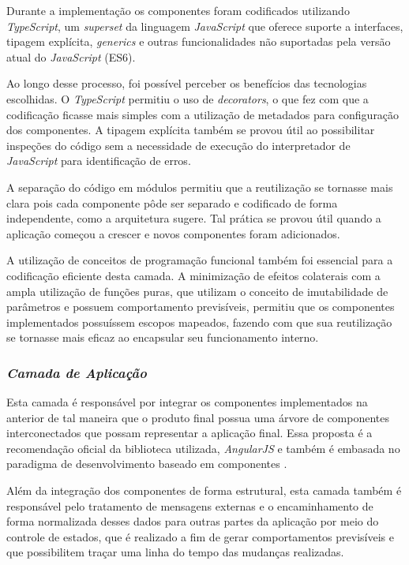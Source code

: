 Durante a implementação os componentes foram codificados utilizando \textit{TypeScript}, um \textit{superset} da linguagem \textit{JavaScript} que oferece suporte a interfaces, tipagem explícita, \textit{generics} e outras funcionalidades não suportadas pela versão atual do \textit{JavaScript} (ES6).

Ao longo desse processo, foi possível perceber os benefícios das tecnologias escolhidas. O \textit{TypeScript} permitiu o uso de \textit{decorators}, o que fez com que a codificação ficasse mais simples com a utilização de metadados para configuração dos componentes. A tipagem explícita também se provou útil ao possibilitar inspeções do código sem a necessidade de execução do interpretador de \textit{JavaScript} para identificação de erros. 

A separação do código em módulos permitiu que a reutilização se tornasse mais clara pois cada componente pôde ser separado e codificado de forma independente, como a arquitetura sugere. Tal prática se provou útil quando a aplicação começou a crescer e novos componentes foram adicionados.

A utilização de conceitos de programação funcional também foi essencial para a codificação eficiente desta camada. A minimização de efeitos colaterais com a ampla utilização de funções puras, que utilizam o conceito de imutabilidade de parâmetros e possuem comportamento previsíveis, permitiu que os componentes implementados possuíssem escopos mapeados, fazendo com que sua reutilização se tornasse mais eficaz ao encapsular seu funcionamento interno.

\subsubsection{{\it Camada de Aplicação}}

Esta camada é responsável por integrar os componentes implementados na anterior de tal maneira que o produto final possua uma árvore de componentes interconectados que possam representar a aplicação final. Essa proposta é a recomendação oficial da biblioteca utilizada, \textit{AngularJS} e também é embasada no paradigma de desenvolvimento baseado em componentes \cite{pressman2011}.

Além da integração dos componentes de forma estrutural, esta camada também é responsável pelo tratamento de mensagens externas e o encaminhamento de forma normalizada desses dados para outras partes da aplicação por meio do controle de estados, que é realizado a fim de gerar comportamentos previsíveis e que possibilitem traçar uma linha do tempo das mudanças realizadas.


